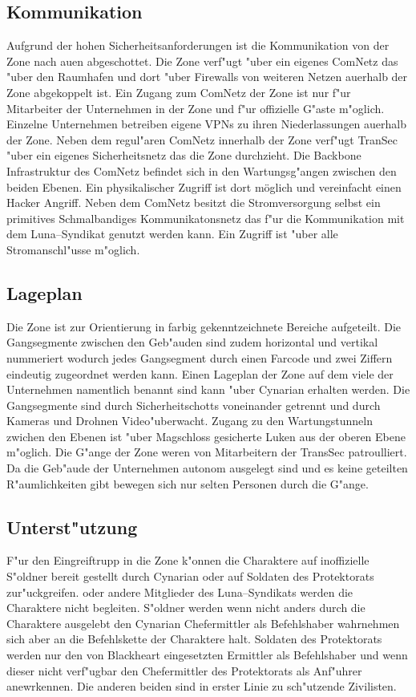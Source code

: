 \subsection{Kommunikation} 
Aufgrund der hohen Sicherheitsanforderungen ist die Kommunikation von der Zone nach au\3en abgeschottet. Die Zone verf"ugt "uber ein eigenes ComNetz das "uber den Raumhafen und dort "uber Firewalls von weiteren Netzen au\3erhalb der Zone abgekoppelt ist. Ein Zugang zum ComNetz der Zone ist nur f"ur Mitarbeiter der Unternehmen in der Zone und f"ur offizielle G"aste m"oglich. Einzelne Unternehmen betreiben eigene VPNs zu ihren Niederlassungen au\3erhalb der Zone. Neben dem regul"aren ComNetz innerhalb der Zone verf"ugt TranSec "uber ein eigenes Sicherheitsnetz das die Zone durchzieht. Die Backbone Infrastruktur des ComNetz befindet sich in den Wartungsg"angen zwischen den beiden Ebenen. Ein physikalischer Zugriff ist dort möglich und vereinfacht einen Hacker Angriff. Neben dem ComNetz besitzt die Stromversorgung selbst ein primitives Schmalbandiges Kommunikatonsnetz das f"ur die Kommunikation mit dem Luna--Syndikat genutzt werden kann. Ein Zugriff ist "uber alle Stromanschl"usse m"oglich.

\subsection{Lageplan} 
Die Zone ist zur Orientierung in farbig gekenntzeichnete Bereiche aufgeteilt. Die Gangsegmente zwischen den Geb"auden sind zudem horizontal und vertikal nummeriert wodurch jedes Gangsegment durch einen Farcode und zwei Ziffern eindeutig zugeordnet werden kann. Einen Lageplan der Zone auf dem viele der Unternehmen namentlich benannt sind kann "uber Cynarian erhalten werden. Die Gangsegmente sind durch Sicherheitschotts voneinander getrennt und durch Kameras und Drohnen Video"uberwacht. Zugang zu den Wartungstunneln zwichen den Ebenen ist "uber Magschloss gesicherte Luken aus der oberen Ebene m"oglich. Die G"ange der Zone weren von Mitarbeitern der TransSec patroulliert. Da die Geb"aude der Unternehmen autonom ausgelegt sind und es keine geteilten R"aumlichkeiten gibt bewegen sich nur selten Personen durch die G"ange.

\subsection{Unterst"utzung} 
F"ur den Eingreiftrupp in die Zone k"onnen die Charaktere auf inoffizielle S"oldner bereit gestellt durch Cynarian oder auf Soldaten des Protektorats zur"uckgreifen. \xl{} oder andere Mitglieder des Luna--Syndikats werden die Charaktere nicht begleiten. S"oldner werden wenn nicht anders durch die Charaktere ausgelebt den Cynarian Chefermittler als Befehlshaber wahrnehmen sich aber an die Befehlskette der Charaktere halt. Soldaten des Protektorats werden nur den von Blackheart eingesetzten Ermittler als Befehlshaber und wenn dieser nicht verf"ugbar den Chefermittler des Protektorats als Anf"uhrer anewrkennen. Die anderen beiden sind in erster Linie zu sch"utzende Zivilisten.

